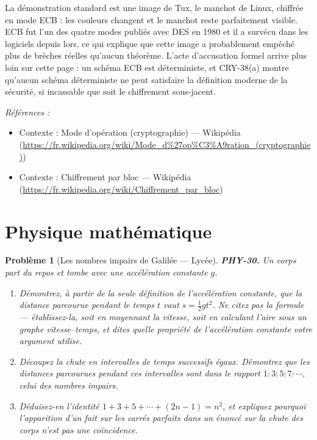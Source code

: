 \documentclass[11pt]{article}
\newtheorem{problem}{Problème}
\newenvironment{refs}{\par\small\noindent\emph{Références :}\begin{itemize}\setlength\itemsep{0pt}}{\end{itemize}\normalsize}
\begin{document}
\noindent La démonstration standard est une image de Tux, le manchot de Linux,
chiffrée en mode ECB : les couleurs changent et le manchot reste parfaitement visible. ECB
fut l'un des quatre modes publiés avec DES en 1980 et il a survécu dans les logiciels depuis
lors, ce qui explique que cette image a probablement empêché plus de brèches réelles
qu'aucun théorème. L'acte d'accusation formel arrive plus loin sur cette page : un schéma ECB
est déterministe, et CRY-38(a) montre qu'aucun schéma déterministe ne peut satisfaire la
définition moderne de la sécurité, si incassable que soit le chiffrement sous-jacent.

\begin{refs}
\item Contexte : Mode d'opération (cryptographie) --- Wikipédia (\url{https://fr.wikipedia.org/wiki/Mode_d%27op%C3%A9ration_(cryptographie)})
\item Contexte : Chiffrement par bloc --- Wikipédia (\url{https://fr.wikipedia.org/wiki/Chiffrement_par_bloc})
\end{refs}

\bigskip


\section*{Physique mathématique}

\begin{problem}[{Les nombres impairs de Galilée --- Lycée}]
\textbf{PHY-30.} Un corps part du repos et tombe avec une accélération constante $ g $.
\begin{enumerate}
\item[(a)] Démontrez, à partir de la seule définition de l'accélération constante, que la distance
parcourue pendant le temps $ t $ vaut $ s = \tfrac{1}{2} g t^{2} $. Ne citez pas la formule ---
établissez-la, soit en moyennant la vitesse, soit en calculant l'aire sous un graphe
vitesse--temps, et dites quelle propriété de l'accélération constante votre argument utilise.
\item[(b)] Découpez la chute en intervalles de temps successifs égaux. Démontrez que les distances
parcourues pendant ces intervalles sont dans le rapport $ 1 : 3 : 5 : 7 : \cdots $, celui des
nombres impairs.
\item[(c)] Déduisez-en l'identité $ 1 + 3 + 5 + \cdots + (2n-1) = n^{2} $, et expliquez pourquoi
l'apparition d'un fait sur les carrés parfaits dans un énoncé sur la chute des corps n'est pas
une coïncidence.
\end{enumerate}

\end{problem}
\end{document}

